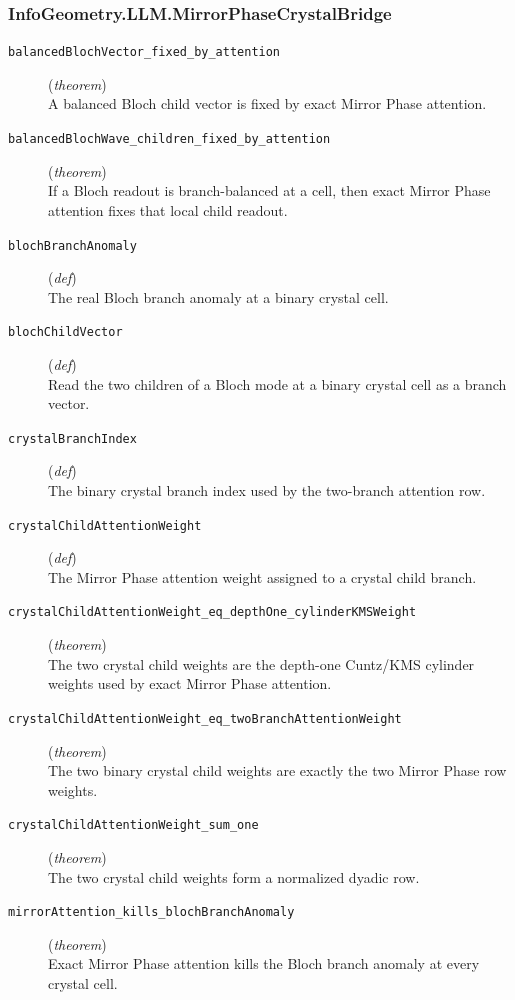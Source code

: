 \documentclass[11pt,a4paper]{article}
\begin{document}
\subsubsection*{InfoGeometry.LLM.MirrorPhaseCrystalBridge}
\begin{description}
  \item[\texttt{balancedBlochVector\_fixed\_by\_attention}] (\textit{theorem}) \\ A balanced Bloch child vector is fixed by exact Mirror Phase attention.
  \item[\texttt{balancedBlochWave\_children\_fixed\_by\_attention}] (\textit{theorem}) \\ If a Bloch readout is branch-balanced at a cell, then exact Mirror Phase 
attention fixes that local child readout.
  \item[\texttt{blochBranchAnomaly}] (\textit{def}) \\ The real Bloch branch anomaly at a binary crystal cell.
  \item[\texttt{blochChildVector}] (\textit{def}) \\ Read the two children of a Bloch mode at a binary crystal cell as a branch vector.
  \item[\texttt{crystalBranchIndex}] (\textit{def}) \\ The binary crystal branch index used by the two-branch attention row.
  \item[\texttt{crystalChildAttentionWeight}] (\textit{def}) \\ The Mirror Phase attention weight assigned to a crystal child branch.
  \item[\texttt{crystalChildAttentionWeight\_eq\_depthOne\_cylinderKMSWeight}] (\textit{theorem}) \\ The two crystal child weights are the depth-one Cuntz/KMS cylinder weights used 
by exact Mirror Phase attention.
  \item[\texttt{crystalChildAttentionWeight\_eq\_twoBranchAttentionWeight}] (\textit{theorem}) \\ The two binary crystal child weights are exactly the two Mirror Phase row weights.
  \item[\texttt{crystalChildAttentionWeight\_sum\_one}] (\textit{theorem}) \\ The two crystal child weights form a normalized dyadic row.
  \item[\texttt{mirrorAttention\_kills\_blochBranchAnomaly}] (\textit{theorem}) \\ Exact Mirror Phase attention kills the Bloch branch anomaly at every crystal cell.
\end{description}
\end{document}
